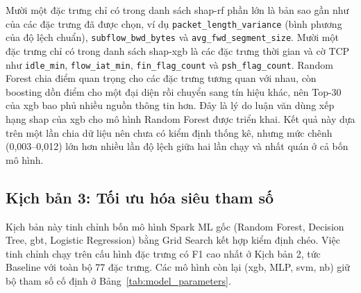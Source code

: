 Mười một đặc trưng chỉ có trong danh sách \ac{shap}-\ac{rf} phần lớn là bản sao gần như của các đặc trưng đã được chọn, ví dụ \texttt{packet\_length\_variance} (bình phương của độ lệch chuẩn), \texttt{subflow\_bwd\_bytes} và \texttt{avg\_fwd\_segment\_size}. Mười một đặc trưng chỉ có trong danh sách \ac{shap}-\ac{xgb} là các đặc trưng thời gian và cờ TCP như \texttt{idle\_min}, \texttt{flow\_iat\_min}, \texttt{fin\_flag\_count} và \texttt{psh\_flag\_count}. Random Forest chia điểm quan trọng cho các đặc trưng tương quan với nhau, còn boosting dồn điểm cho một đại diện rồi chuyển sang tín hiệu khác, nên Top-30 của \ac{xgb} bao phủ nhiều nguồn thông tin hơn. Đây là lý do luận văn dùng xếp hạng \ac{shap} của \ac{xgb} cho mô hình Random Forest được triển khai. Kết quả này dựa trên một lần chia dữ liệu nên chưa có kiểm định thống kê, nhưng mức chênh (0{,}003--0{,}012) lớn hơn nhiều lần độ lệch giữa hai lần chạy và nhất quán ở cả bốn mô hình.

\subsection{Kịch bản 3: Tối ưu hóa siêu tham số}
Kịch bản này tinh chỉnh bốn mô hình Spark ML gốc (Random Forest, Decision Tree, \ac{gbt}, Logistic Regression) bằng Grid Search kết hợp kiểm định chéo. Việc tinh chỉnh chạy trên cấu hình đặc trưng có F1 cao nhất ở Kịch bản 2, tức Baseline với toàn bộ 77 đặc trưng. Các mô hình còn lại (\ac{xgb}, MLP, \ac{svm}, \ac{nb}) giữ bộ tham số cố định ở Bảng~\ref{tab:model_parameters}.

